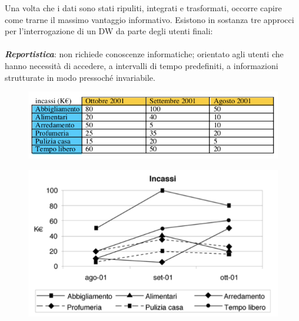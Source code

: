 \documentclass[a4paper, notitlepage, 9pt]{extreport}
\begin{document}
Una volta che i dati sono stati ripuliti, integrati e trasformati, occorre capire come trarne il massimo vantaggio informativo. Esistono in sostanza tre approcci per l'interrogazione di un DW da parte degli utenti finali:
\\\\
\textit{\textbf{Reportistica}}: non richiede conoscenze informatiche; orientato agli utenti che hanno necessità di accedere, a intervalli di tempo predefiniti, a informazioni strutturate in modo pressoché invariabile.
\begin{multicols}{2}
	\begin{figure}[H]
		\centering
		\includegraphics[scale=0.5]{Reportistica}
	\end{figure}
\columnbreak
	\begin{figure}[H]
		\centering
		\includegraphics[scale=0.4]{Reportistica2}
	\end{figure}
\end{multicols}
\end{document}
